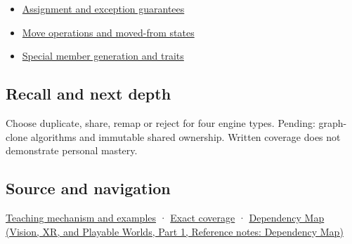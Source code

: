 \hypertarget{appendix-1340cd1ce582-used-by}{}

\begin{itemize}
\tightlist
\item
  \hyperref[appendix-bea6beb5350f]{Assignment and exception guarantees}
\item
  \hyperref[appendix-5636651017c2]{Move operations and moved-from states}
\item
  \hyperref[appendix-42e02a12c694]{Special member generation and traits}
\end{itemize}

\subsection{Recall and next depth}\label{appendix-1340cd1ce582-recall-and-next-depth}

\hypertarget{appendix-1340cd1ce582-recall-and-next-depth}{}

Choose duplicate, share, remap or reject for four engine types. Pending: graph-clone algorithms and immutable shared ownership. Written coverage does not demonstrate personal mastery.

\subsection{Source and navigation}\label{appendix-1340cd1ce582-source-and-navigation}

\hypertarget{appendix-1340cd1ce582-source-and-navigation}{}

\hyperref[01-foundations-i-ch003-copy-a-meaning-rather-than-just-its-bytes]{Teaching mechanism and examples} · \hyperref[appendix-fd090d982a15-m009---parts-127-147]{Exact coverage} · \href{../07-Vision-XR-and-Playable-Worlds-P01/main.pdf\#nameddest=appendix-4ad47bdd269a}{Dependency Map (Vision, XR, and Playable Worlds, Part 1, Reference notes: Dependency Map)}
